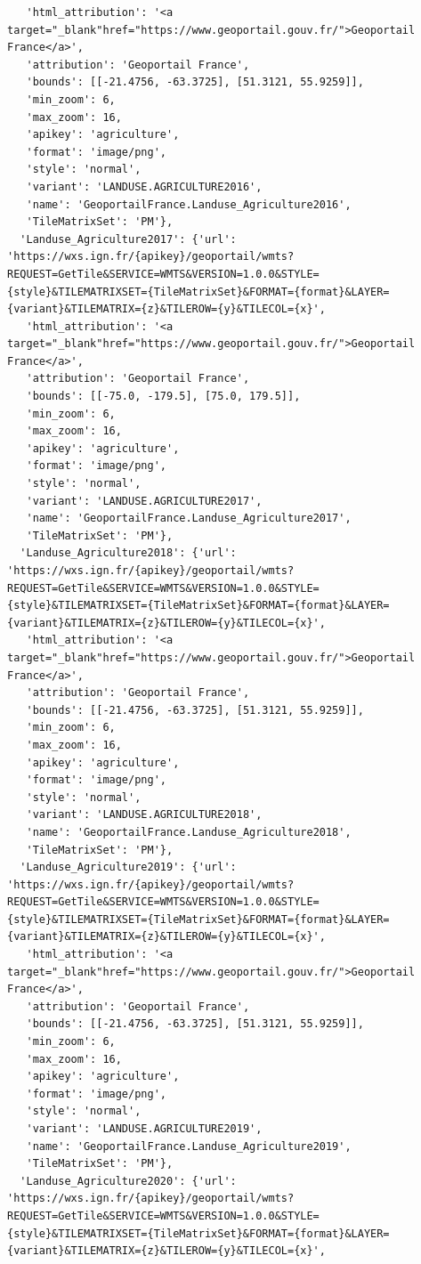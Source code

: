 \documentclass[
  letterpaper,
  DIV=11,
  numbers=noendperiod]{scrreprt}
\begin{document}
\begin{verbatim}
   'html_attribution': '<a target="_blank"href="https://www.geoportail.gouv.fr/">Geoportail France</a>',
   'attribution': 'Geoportail France',
   'bounds': [[-21.4756, -63.3725], [51.3121, 55.9259]],
   'min_zoom': 6,
   'max_zoom': 16,
   'apikey': 'agriculture',
   'format': 'image/png',
   'style': 'normal',
   'variant': 'LANDUSE.AGRICULTURE2016',
   'name': 'GeoportailFrance.Landuse_Agriculture2016',
   'TileMatrixSet': 'PM'},
  'Landuse_Agriculture2017': {'url': 'https://wxs.ign.fr/{apikey}/geoportail/wmts?REQUEST=GetTile&SERVICE=WMTS&VERSION=1.0.0&STYLE={style}&TILEMATRIXSET={TileMatrixSet}&FORMAT={format}&LAYER={variant}&TILEMATRIX={z}&TILEROW={y}&TILECOL={x}',
   'html_attribution': '<a target="_blank"href="https://www.geoportail.gouv.fr/">Geoportail France</a>',
   'attribution': 'Geoportail France',
   'bounds': [[-75.0, -179.5], [75.0, 179.5]],
   'min_zoom': 6,
   'max_zoom': 16,
   'apikey': 'agriculture',
   'format': 'image/png',
   'style': 'normal',
   'variant': 'LANDUSE.AGRICULTURE2017',
   'name': 'GeoportailFrance.Landuse_Agriculture2017',
   'TileMatrixSet': 'PM'},
  'Landuse_Agriculture2018': {'url': 'https://wxs.ign.fr/{apikey}/geoportail/wmts?REQUEST=GetTile&SERVICE=WMTS&VERSION=1.0.0&STYLE={style}&TILEMATRIXSET={TileMatrixSet}&FORMAT={format}&LAYER={variant}&TILEMATRIX={z}&TILEROW={y}&TILECOL={x}',
   'html_attribution': '<a target="_blank"href="https://www.geoportail.gouv.fr/">Geoportail France</a>',
   'attribution': 'Geoportail France',
   'bounds': [[-21.4756, -63.3725], [51.3121, 55.9259]],
   'min_zoom': 6,
   'max_zoom': 16,
   'apikey': 'agriculture',
   'format': 'image/png',
   'style': 'normal',
   'variant': 'LANDUSE.AGRICULTURE2018',
   'name': 'GeoportailFrance.Landuse_Agriculture2018',
   'TileMatrixSet': 'PM'},
  'Landuse_Agriculture2019': {'url': 'https://wxs.ign.fr/{apikey}/geoportail/wmts?REQUEST=GetTile&SERVICE=WMTS&VERSION=1.0.0&STYLE={style}&TILEMATRIXSET={TileMatrixSet}&FORMAT={format}&LAYER={variant}&TILEMATRIX={z}&TILEROW={y}&TILECOL={x}',
   'html_attribution': '<a target="_blank"href="https://www.geoportail.gouv.fr/">Geoportail France</a>',
   'attribution': 'Geoportail France',
   'bounds': [[-21.4756, -63.3725], [51.3121, 55.9259]],
   'min_zoom': 6,
   'max_zoom': 16,
   'apikey': 'agriculture',
   'format': 'image/png',
   'style': 'normal',
   'variant': 'LANDUSE.AGRICULTURE2019',
   'name': 'GeoportailFrance.Landuse_Agriculture2019',
   'TileMatrixSet': 'PM'},
  'Landuse_Agriculture2020': {'url': 'https://wxs.ign.fr/{apikey}/geoportail/wmts?REQUEST=GetTile&SERVICE=WMTS&VERSION=1.0.0&STYLE={style}&TILEMATRIXSET={TileMatrixSet}&FORMAT={format}&LAYER={variant}&TILEMATRIX={z}&TILEROW={y}&TILECOL={x}',

\end{verbatim}
\end{document}
